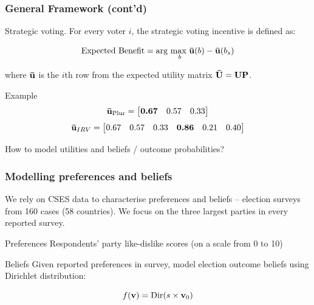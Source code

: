 \documentclass[10pt, en-GB]{beamer}
\begin{document}
\begin{frame}[t]\frametitle{General Framework (cont'd)}

\alert{Strategic voting.} For every voter $i$, the strategic voting incentive is defined as:

\begin{equation}
	\text{Expected Benefit} = \text{arg } \underset{b}{\text{max }} {\bf \bar{u}}(b) - {\bf \bar{u}}(b_s)
\end{equation}

where $\bf \bar{u}$ is the $i$th row from the expected utility matrix $\bf \bar{U} = UP$.

\pause
\begin{block}{Example}
\begin{equation*}
	{\bf \bar{u}}_{\text{Plur}} = \begin{bmatrix}
	\textbf{0.67} & 0.57 & 0.33
	\end{bmatrix}
\end{equation*}
\begin{equation*}
	{\bf \bar{u}}_{{IRV}} = \begin{bmatrix}
	0.67 & 0.57 & 0.33 & \textbf{0.86} & 0.21 & 0.40
	\end{bmatrix}
\end{equation*}
\end{block}

\pause
How to model utilities and beliefs / outcome probabilities?

\end{frame}

\begin{frame}[t]\frametitle{Modelling preferences and beliefs}

We rely on CSES data to characterise preferences and beliefs -- election surveys from 160 cases (58 countries). We focus on the three largest parties in every reported survey.
\pause
\begin{block}{Preferences}
	Respondents' party like-dislike scores (on a scale from 0 to 10)
\end{block}
\pause
\begin{block}{Beliefs}
	Given reported preferences in survey, model election outcome beliefs using Dirichlet distribution:

	\begin{equation*}
		f({\bf v}) = \text{Dir} (s \times {\bf v}_0)
	\end{equation*}
\end{block}
\end{frame}
\end{document}
